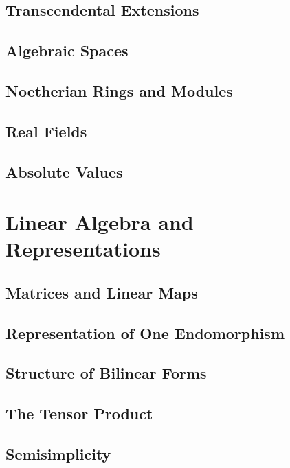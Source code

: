 \documentclass[oneside]{amsbook}
\numberwithin{ex}{chapter}
\begin{document}
\chapter{Transcendental Extensions}


\chapter{Algebraic Spaces}


\chapter{Noetherian Rings and Modules}


\chapter{Real Fields}


\chapter{Absolute Values}


\part{Linear Algebra and Representations}
\chapter{Matrices and Linear Maps}


\chapter{Representation of One Endomorphism}


\chapter{Structure of Bilinear Forms}


\chapter{The Tensor Product}


\chapter{Semisimplicity}

\end{document}
